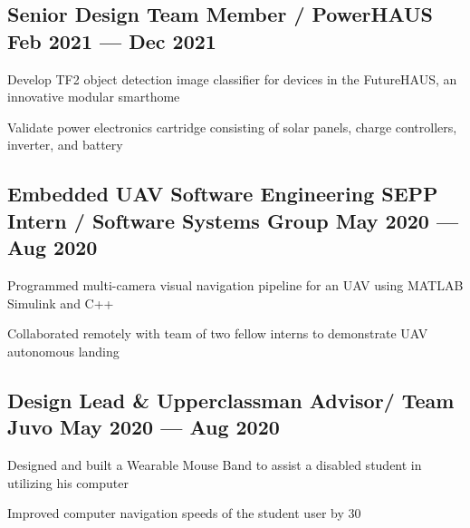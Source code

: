 \subsection{{Senior Design Team Member / PowerHAUS \hfill Feb 2021 --- Dec 2021}}
\begin{zitemize}
	\item Develop TF2 object detection image classifier for devices in the FutureHAUS, an innovative modular smarthome
	\item Validate power electronics cartridge consisting of solar panels, charge controllers, inverter, and battery
\end{zitemize}


\subsection{{Embedded UAV Software Engineering SEPP Intern / Software Systems Group  \hfill May 2020 --- Aug 2020}}
\begin{zitemize}
	\item Programmed multi-camera visual navigation pipeline for an UAV using MATLAB Simulink and C++
	\item Collaborated remotely with team of two fellow interns to demonstrate UAV autonomous landing
\end{zitemize}

\subsection{{Design Lead & Upperclassman Advisor/ Team Juvo  \hfill May 2020 --- Aug 2020}}
\begin{zitemize}
	\item Designed and built a Wearable Mouse Band to assist a disabled student in utilizing his computer
	\item Improved computer navigation speeds of the student user by 30%
\end{zitemize}

